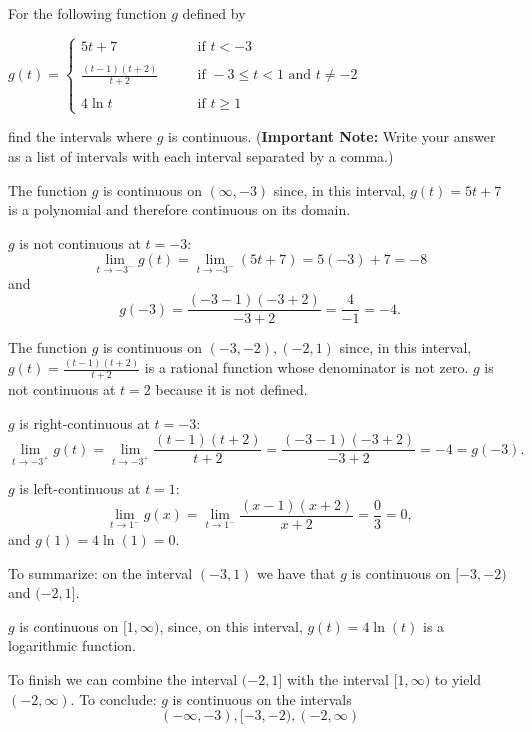 \documentclass[nooutcomes, handout]{ximera}
\begin{document}
\begin{problem}
For the following function $g$ defined by
	
	$g(t) =   \left\{ \begin{array}{cl}
	5t + 7		 	&	\qquad \text{if } t < -3					\\ \\
	\frac{(t-1)(t+2)}{t+2}	&	\qquad \text{if } -3 \leq t < 1 \text{ and } t \neq -2	\\ \\
	4 \ln t				&	\qquad \text{if } t \geq 1					\end{array} \right.  $

  find the intervals where $g$ is continuous.  (\textbf{Important Note:} Write your answer as a list of intervals with each interval separated by a comma.)	

	\begin{freeResponse}
	The function $g$ is continuous on $(\infty, -3)$ since, in this interval, $g(t)=5t+7$ is a polynomial and therefore continuous on its domain.
  
  $g$ is not continuous at $t = -3$:
  \[
    \lim_{t \to -3^-} g(t) = \lim_{t \to -3^-} (5t+7) = 5(-3) + 7 = -8
  \]
  and
  \[
    g(-3) = \frac{(-3-1)(-3+2)}{-3+2} = \frac{4}{-1} = -4.
  \]

  The function $g$ is continuous on $(-3, -2),(-2,1)$ since, in this interval, $g(t) = \frac{(t-1)(t+2)}{t+2}$ is a rational function whose denominator is not zero. $g$ is not continuous at $t=2$ because it is not defined.

  $g$ is right-continuous at $t = -3$:
  \[
    \lim_{t \to -3^+} g(t) = \lim_{t \to -3^+} \frac{(t-1)(t+2)}{t+2} = \frac{(-3-1)(-3+2)}{-3+2} = -4 = g(-3).
  \]

  $g$ is left-continuous at $t = 1$:
  \[
    \lim_{t \to 1^-} g(x) = \lim_{t \to 1^-} \frac{(x-1)(x+2)}{x+2} = \frac{0}{3} = 0,
  \]
  and $g(1) = 4 \ln(1) = 0$.

  To summarize: on the interval $(-3, 1)$ we have that $g$ is continuous on $[-3, -2)$ and $(-2, 1]$.
  
  $g$ is continuous on $[1, \infty)$, since, on this interval, $g(t) =  4 \ln(t)$ is a logarithmic function.

  To finish we can combine the interval $(-2, 1]$ with the interval $[1, \infty)$ to yield $(-2, \infty)$.
  To conclude: $g$ is continuous on the intervals \[(-\infty, -3), [-3, -2), (-2, \infty)\]
  \end{freeResponse}
	
		
	
\end{problem}
	
\end{document}
